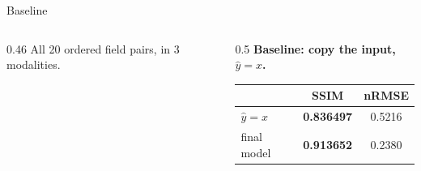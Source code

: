 \documentclass[aspectratio=169,11pt]{beamer}
\newcommand{\hl}[1]{\textcolor{accent}{\textbf{#1}}}
\newcommand{\gloss}[1]{{\footnotesize\textcolor{black!65}{#1}}\par}
\begin{document}
\begin{frame}{Baseline}
\begin{columns}[c,onlytextwidth]
\begin{column}{0.46\textwidth}
    \vspace{2mm}
    \gloss{All 20 ordered field pairs, in 3 modalities.}
  \end{column}

  \begin{column}{0.5\textwidth}
    \textbf{Baseline: copy the input, $\hat y = x$.}

    \vspace{4mm}
    \centering
    \begin{tabular}{lcc}
      \toprule
      & SSIM & nRMSE \\
      \midrule
      $\hat y = x$      & \hl{0.836497} & 0.5216 \\
      final model   & \hl{0.913652} & 0.2380 \\
      \bottomrule
    \end{tabular}
  \end{column}
  \end{columns}
\end{frame}
\end{document}
